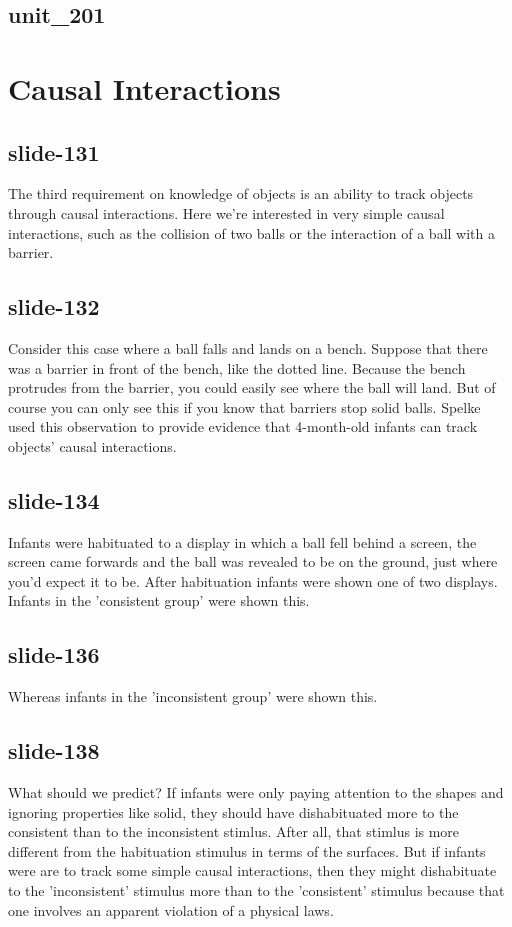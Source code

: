 \documentclass[12pt,\papersize]{extarticle}
\begin{document}
 
\subsection{unit\_201}
 
\section{Causal Interactions}
 
 
\subsection{slide-131}
The third requirement on knowledge of objects is an ability to track objects through causal interactions.
Here we're interested in very simple causal interactions, such as the collision of two balls or the interaction of a ball with a barrier.
 
 
\subsection{slide-132}
Consider this case where a ball falls and lands on a bench.
Suppose that there was a barrier in front of the bench, like the dotted line.
Because the bench protrudes from the barrier, you could easily see where the ball will land.
But of course you can only see this if you know that barriers stop solid balls.
Spelke used this observation to provide evidence that 4-month-old infants can track objects' causal interactions.
 
 
\subsection{slide-134}
Infants were habituated to a display in which a ball fell behind a screen, the screen came forwards and the ball was revealed to be on the ground, just where you'd expect it to be.
After habituation infants were shown one of two displays.
Infants in the 'consistent group' were shown this.
 
 
\subsection{slide-136}
Whereas infants in the 'inconsistent group' were shown this.
 
 
\subsection{slide-138}
What should we predict?
If infants were only paying attention to the shapes and ignoring properties like solid, they should have dishabituated more to the consistent than to the inconsistent stimlus.
After all, that stimlus is more different from the habituation stimulus in terms of the surfaces.
But if infants were are to track some simple causal interactions, then they might dishabituate to the 'inconsistent' stimulus more than to the 'consistent' stimulus because that one involves an apparent violation of a physical laws.
 
\end{document}
